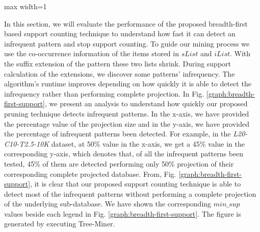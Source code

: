 \begin{figure*}[ht]
\begin{adjustbox}{max width=1\textwidth}
           \end{adjustbox}
         \caption{Evaluation of Breadth-First Based Support Counting Technique}
        \label{graph:breadth-first-support}
\end{figure*}

In this section, we will evaluate the performance of the proposed breadth-first based support counting technique to understand how fast it can detect an infrequent pattern and stop support counting. To guide our mining process we use the co-occurrence information of the items stored in $sList$ and $iList$. With the suffix extension of the pattern these two lists shrink. During support calculation of the extensions, we discover some patterns' infrequency. The algorithm's runtime improves depending on how quickly it is able to detect the infrequency rather than performing complete projection. In Fig. \ref{graph:breadth-first-support}, we present an analysis to understand how quickly our proposed pruning technique detects infrequent patterns. In the x-axis, we have provided the percentage value of the projection size and in the y-axis, we have provided the percentage of infrequent patterns been detected. For example, in the \textit{L20-C10-T2.5-10K} dataset, at 50\% value in the x-axis, we get a 45\% value in the corresponding y-axis, which denotes that, of all the infrequent patterns been tested, 45\% of them are detected performing only 50\% projection of their corresponding complete projected database. From, Fig. \ref{graph:breadth-first-support}, it is clear that our proposed support counting technique is able to detect most of the infrequent patterns without performing a complete projection of the underlying sub-database. We have shown the corresponding $min\_sup$ values beside each legend in Fig. \ref{graph:breadth-first-support}.  The figure is generated by executing Tree-Miner.



